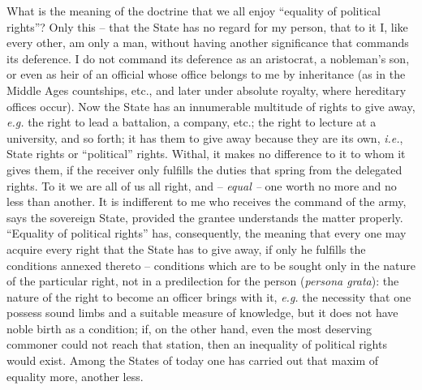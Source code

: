\documentclass[12pt,a4paper]{book}
\begin{document}
What is the meaning of the doctrine that we all enjoy ``equality of political 
rights''? Only this -- that the State has no regard for my person, that to it 
I, like every other, am only a man, without having another significance that 
commands its deference. I do not command its deference as an aristocrat, a 
nobleman's son, or even as heir of an official whose office belongs to me by 
inheritance (as in the Middle Ages countships, etc., and later under absolute 
royalty, where hereditary offices occur). Now the State has an innumerable 
multitude of rights to give away, \textit{e.g.} the right to lead a 
battalion, a company, etc.; the right to lecture at a university, and so 
forth; it has them to give away because they are its own, \textit{i.e.}, State 
rights or ``political'' rights. Withal, it makes no difference to it to whom 
it gives them, if the receiver only fulfills the duties that spring from the 
delegated rights. To it we are all of us all right, and -- \textit{equal --} 
one worth no more and no less than another. It is indifferent to me who 
receives the command of the army, says the sovereign State, provided the 
grantee understands the matter properly. ``Equality of political rights'' 
has, consequently, the meaning that every one may acquire every right that the 
State has to give away, if only he fulfills the conditions annexed thereto -- 
conditions which are to be sought only in the nature of the particular right, 
not in a predilection for the person (\textit{persona grata}): the nature of 
the right to become an officer brings with it, \textit{e.g.} the necessity 
that one possess sound limbs and a suitable measure of knowledge, but it does 
not have noble birth as a condition; if, on the other hand, even the most 
deserving commoner could not reach that station, then an inequality of 
political rights would exist. Among the States of today one has carried out 
that maxim of equality more, another less.
\end{document}
